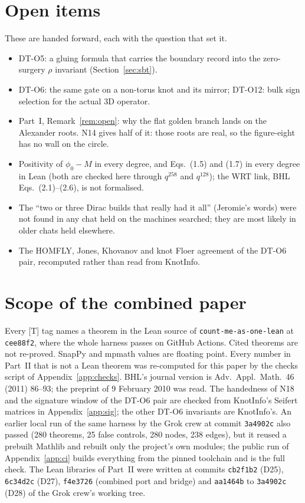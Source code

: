 \documentclass[11pt]{article}
\theoremstyle{definition}
\begin{document}
\section{Open items}\label{sec:open}
These are handed forward, each with the question that set it.
\begin{itemize}[leftmargin=2em]
\item DT-O5: a gluing formula that carries the boundary record into the zero-surgery $\rho$ invariant (Section~\ref{sec:sbt}).
\item DT-O6: the same gate on a non-torus knot and its mirror; DT-O12: bulk sign selection for the actual 3D operator.
\item Part~I, Remark~\ref{rem:open}: why the flat golden branch lands on the Alexander roots. N14 gives half of it: those roots are real, so the figure-eight has no wall on the circle.
\item Positivity of $\phi_0-M$ in every degree, and Eqs.~(1.5) and (1.7) in every degree in Lean (both are checked here through $q^{258}$ and $q^{128}$); the WRT link, BHL Eqs.~(2.1)--(2.6), is not formalised.
\item The ``two or three Dirac builds that really had it all'' (Jeromie's words) were not found in any chat held on the machines searched; they are most likely in older chats held elsewhere.
\item The HOMFLY, Jones, Khovanov and knot Floer agreement of the DT-O6 pair, recomputed rather than read from KnotInfo.
\end{itemize}

\section{Scope of the combined paper}
Every \textsf{[T]} tag names a theorem in the Lean source of \texttt{count-me-as-one-lean} at \texttt{cee88f2}, where the whole harness passes on GitHub Actions. Cited theorems are not re-proved. SnapPy and mpmath values are floating point. Every number in Part~II that is not a Lean theorem was re-computed for this paper by the checks script of Appendix~\ref{app:checks}. BHL's journal version is Adv.\ Appl.\ Math.\ 46 (2011) 86--93; the preprint of 9 February 2010 was read. The handedness of N18 and the signature window of the DT-O6 pair are checked from KnotInfo's Seifert matrices in Appendix~\ref{app:sig}; the other DT-O6 invariants are KnotInfo's. An earlier local run of the same harness by the Grok crew at commit \texttt{3a4902c} also passed (280 theorems, 25 false controls, 280 nodes, 238 edges), but it reused a prebuilt Mathlib and rebuilt only the project's own modules; the public run of Appendix~\ref{app:ci} builds everything from the pinned toolchain and is the full check. The Lean libraries of Part~II were written at commits \texttt{cb2f1b2} (D25), \texttt{6c34d2c} (D27), \texttt{f4e3726} (combined port and bridge) and \texttt{aa1464b} to \texttt{3a4902c} (D28) of the Grok crew's working tree.
\end{document}
